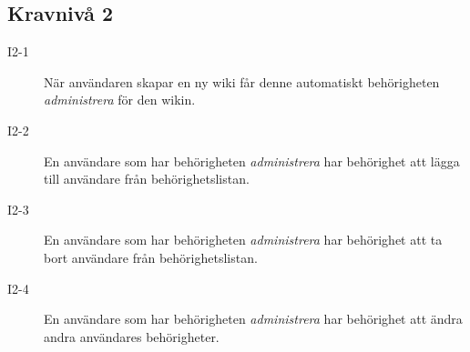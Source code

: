 \subsection{Kravnivå 2}
\begin{description}
\item[I2-1] När användaren skapar en ny wiki får denne automatiskt behörigheten \emph{administrera} för den wikin.
\item[I2-2] En användare som har behörigheten \emph{administrera} har behörighet att lägga till användare från behörighetslistan.
\item[I2-3] En användare som har behörigheten \emph{administrera} har behörighet att ta bort användare från behörighetslistan.
\item[I2-4] En användare som har behörigheten \emph{administrera} har behörighet att ändra andra användares behörigheter.
\end{description}



